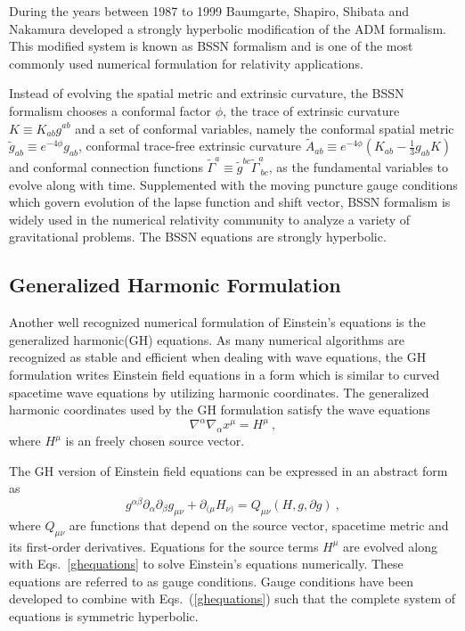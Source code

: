 During the years between 1987 to 1999 Baumgarte, Shapiro, Shibata and Nakamura\cite{Shibata:1995we, Baumgarte:1998te} developed a strongly hyperbolic modification of the ADM formalism. This modified system is known as BSSN formalism and is one of the most commonly used numerical formulation for relativity applications. 

Instead of evolving the spatial metric and extrinsic curvature, the BSSN formalism chooses a conformal factor $\phi$, the trace of extrinsic curvature $K \equiv K_{ab}g^{ab}$ and a set of conformal variables, namely the conformal spatial metric ${\tilde g}_{ab} \equiv e^{-4\phi}g_{ab}$, conformal trace-free extrinsic curvature ${\tilde A}_{ab} \equiv e^{-4\phi}(K_{ab} - \frac{1}{3}g_{ab}K)$ and conformal connection functions ${\tilde \Gamma}^{a} \equiv {\tilde g}^{bc}{\tilde \Gamma}^{a}_{~bc}$, as the fundamental variables to evolve along with time. Supplemented with the moving puncture gauge conditions which govern evolution of the lapse function and shift vector, BSSN formalism is widely used in the numerical relativity community to analyze a variety of gravitational problems. The BSSN equations are strongly hyperbolic. 

\subsection{Generalized Harmonic Formulation}
Another well recognized numerical formulation of Einstein's equations is the generalized harmonic(GH) equations\cite{Friedrich:1985, Garfinkle:2001ni, Pretorius:2006tp}. As many numerical algorithms are recognized as stable and efficient when dealing with wave equations, the GH formulation writes Einstein field equations in a form which is similar to curved spacetime wave equations by utilizing harmonic coordinates. The generalized harmonic coordinates used by the GH formulation satisfy the wave equations
\begin{equation}
	\nabla^{\alpha}\nabla_{\alpha}x^{\mu} = H^{\mu} \ ,
\end{equation}
where $H^{\mu}$ is an freely chosen source vector\cite{Friedrich:1985, Friedrich:1996, Garfinkle:2001ni}.

The GH version of Einstein field equations can be expressed in an abstract form as
\begin{equation}\label{ghequations}
	g^{\alpha\beta}\partial_{\alpha}\partial_{\beta}g_{\mu\nu} + \partial_{(\mu}H_{\nu)} = Q_{\mu\nu}(H, g, \partial g) \ , 
\end{equation}
where $Q_{\mu\nu}$ are functions that depend on the source vector, spacetime metric and its first-order derivatives. Equations for the source terms $H^{\mu}$ are evolved along with Eqs.~\ref{ghequations} to solve Einstein's equations numerically. These equations are referred to as gauge conditions. Gauge conditions\cite{Lindblom:2007xw, Lindblom:2009tu} have been developed to combine with Eqs.~(\ref{ghequations}) such that the complete system of equations is symmetric hyperbolic\cite{Lindblom:2005qh}. 

